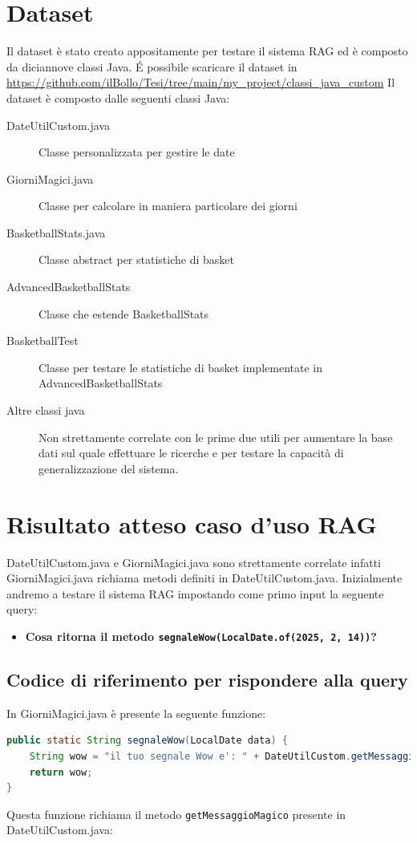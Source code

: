 \documentclass[12pt,a4paper,openright,twoside]{book}
\begin{document}
\section{Dataset}
Il dataset è stato creato appositamente per testare il sistema RAG ed è composto da diciannove classi Java.
\'E possibile scaricare il dataset in \url{https://github.com/ilBollo/Tesi/tree/main/my_project/classi_java_custom}
Il dataset è composto dalle seguenti classi Java: 
\begin{description}
    \item[DateUtilCustom.java] Classe personalizzata per gestire le date
    \item[GiorniMagici.java] Classe per calcolare in maniera particolare dei giorni
    \item[BasketballStats.java] Classe abstract per statistiche di basket
    \item[AdvancedBasketballStats] Classe che estende BasketballStats
    \item[BasketballTest] Classe per testare le statistiche di basket implementate in AdvancedBasketballStats
    \item[Altre classi java] Non strettamente correlate con le prime due utili per aumentare la base dati sul quale effettuare le ricerche e per testare la capacità di generalizzazione del sistema.
\end{description}

\section{Risultato atteso caso d'uso RAG}
DateUtilCustom.java e GiorniMagici.java sono strettamente correlate infatti GiorniMagici.java richiama metodi definiti in DateUtilCustom.java.
Inizialmente andremo a testare il sistema RAG impostando come primo input la seguente query: 
\begin{itemize}
    \item \textbf{Cosa ritorna il metodo \texttt{segnaleWow(LocalDate.of(2025, 2, 14))}?}
\end{itemize}

\subsection{Codice di riferimento per rispondere alla query}
In GiorniMagici.java è presente la seguente funzione:
\begin{lstlisting}[language=Java, caption={Metodo segnaleWow in GiorniMagici.java}, label={lst:segnaleWow}]
public static String segnaleWow(LocalDate data) {
    String wow = "il tuo segnale Wow e': " + DateUtilCustom.getMessaggioMagico(data);
    return wow;
}
\end{lstlisting}
Questa funzione richiama il metodo \texttt{getMessaggioMagico} presente in DateUtilCustom.java:
\end{document}
